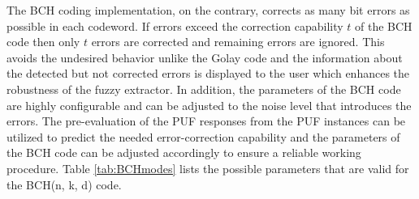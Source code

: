 The BCH coding implementation, on the contrary, corrects as many bit errors as possible in each codeword. If errors exceed the correction capability $t$ of the BCH code then only $t$ errors are corrected and remaining errors are ignored. This avoids the undesired behavior unlike the Golay code and the information about the detected but not corrected errors is displayed to the user which enhances the robustness of the fuzzy extractor. In addition, the parameters of the BCH code are
highly configurable and can be adjusted to the noise level that introduces the errors. The pre-evaluation of the PUF responses from the PUF instances can be utilized to predict the needed error-correction capability and the parameters of the BCH code can be adjusted accordingly to ensure a reliable working procedure. Table \ref{tab:BCHmodes} lists the possible parameters that are valid for the BCH(n, k, d) code.\\

